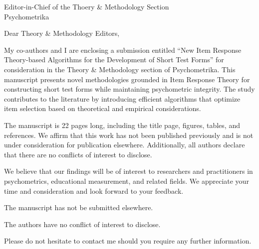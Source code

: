 \documentclass[12pt]{letter}
\begin{document}
	
	\begin{letter}{Editor-in-Chief of the Thoery \& Methodology Section\\ Psychometrika}
		
		\opening{Dear Theory \& Methodology Editors,}
		
		My co-authors and I are enclosing a submission entitled ``New Item Response Theory-based Algorithms for the Development of Short Test Forms'' for consideration in the Theory \& Methodology section of Psychometrika. 
		This manuscript presents novel methodologies grounded in Item Response Theory for constructing short test forms while maintaining psychometric integrity. The study contributes to the literature by introducing efficient algorithms that optimize item selection based on theoretical and empirical considerations.
		
		The manuscript is 22 pages long, including the title page, figures, tables, and references. We affirm that this work has not been published previously and is not under consideration for publication elsewhere. Additionally, all authors declare that there are no conflicts of interest to disclose.
		
		We believe that our findings will be of interest to researchers and practitioners in psychometrics, educational measurement, and related fields. We appreciate your time and consideration and look forward to your feedback.
		
		
		The manuscript has not be submitted elsewhere. 
		
		The authors have no conflict of interest to disclose.
		
		
			Please do not hesitate to contact me should you require any further information.
		
	\end{letter}
	
\end{document}
